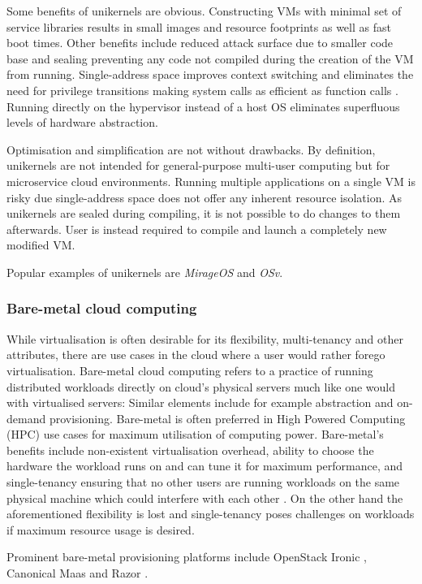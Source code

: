 Some benefits of unikernels are obvious. Constructing VMs with minimal set of service libraries results in small images and resource footprints as well as fast boot times. Other benefits include reduced attack surface due to smaller code base and sealing preventing any code not compiled during the creation of the VM from running. Single-address space improves context switching and eliminates the need for privilege transitions making system calls as efficient as function calls \cite{osv}. Running directly on the hypervisor instead of a host OS eliminates superfluous levels of hardware abstraction.

Optimisation and simplification are not without drawbacks. By definition, unikernels are not intended for general-purpose multi-user computing but for microservice cloud environments. Running multiple applications on a single VM is risky due single-address space does not offer any inherent resource isolation. As unikernels are sealed during compiling, it is not possible to do changes to them afterwards. User is instead required to compile and launch a completely new modified VM.

Popular examples of unikernels are \textit{MirageOS}\cite{mirage} and \textit{OSv}\cite{osv}.

\subsubsection{Bare-metal cloud computing}

While virtualisation is often desirable for its flexibility, multi-tenancy and other attributes, there are use cases in the cloud where a user would rather forego virtualisation. Bare-metal cloud computing refers to a practice of running distributed workloads directly on  cloud's physical servers much like one would with virtualised servers: Similar elements include for example abstraction and on-demand provisioning. Bare-metal is often preferred in High Powered Computing (HPC) use cases for maximum utilisation of computing power. Bare-metal's benefits include non-existent virtualisation overhead, ability to choose the hardware the workload runs on and can tune it for maximum performance, and single-tenancy ensuring that no other users are running workloads on the same physical machine which could interfere with each other \cite{baremetal}. On the other hand the aforementioned flexibility is lost and single-tenancy poses challenges on workloads if maximum resource usage is desired. 

Prominent bare-metal provisioning platforms include OpenStack Ironic \cite{ironic}, Canonical Maas \cite{MaaS} and Razor \cite{razor}.

